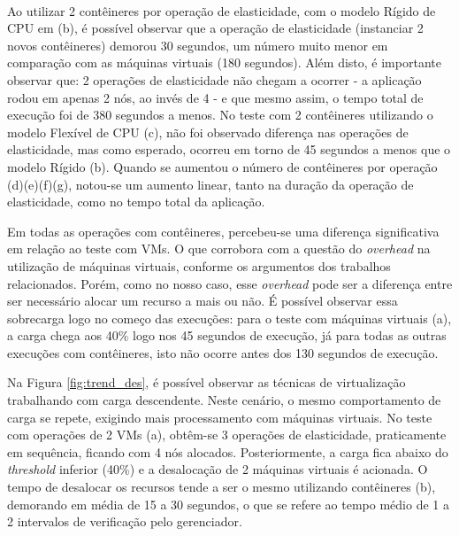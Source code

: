 \documentclass[twoside,english,brazilian]{UNISINOSartigo}
\begin{document}
\begin{figure}[ht!]
\vspace{-0.4\baselineskip}
\\
\end{figure}

Ao utilizar 2 contêineres por operação de elasticidade, com o modelo Rígido de CPU em (b), é possível observar que a operação de elasticidade (instanciar 2 novos contêineres) demorou 30 segundos, um número muito menor em comparação com as máquinas virtuais (180 segundos). Além disto, é importante observar que: 2 operações de elasticidade não chegam a ocorrer - a aplicação rodou em apenas 2 nós, ao invés de 4 - e que mesmo assim, o tempo total de execução foi de 380 segundos a menos. No teste com 2 contêineres utilizando o modelo Flexível de CPU (c), não foi observado diferença nas operações de elasticidade, mas como esperado, ocorreu em torno de 45 segundos a menos que o modelo Rígido (b). Quando se aumentou o número de contêineres por operação (d)(e)(f)(g), notou-se um aumento linear, tanto na duração da operação de elasticidade, como no tempo total da aplicação. 

Em todas as operações com contêineres, percebeu-se uma diferença significativa em relação ao teste com VMs. O que corrobora com a questão do \textit{overhead} na utilização de máquinas virtuais, conforme os argumentos dos trabalhos relacionados. Porém, como no nosso caso, esse \textit{overhead} pode ser a diferença entre ser necessário alocar um recurso a mais ou não. É possível observar essa sobrecarga logo no começo das execuções: para o teste com máquinas virtuais (a), a carga chega aos 40\% logo nos 45 segundos de execução, já para todas as outras execuções com contêineres, isto não ocorre antes dos 130 segundos de execução.

Na Figura \ref{fig:trend_des}, é possível observar as técnicas de virtualização trabalhando com carga descendente. Neste cenário, o mesmo comportamento de carga se repete, exigindo mais processamento com máquinas virtuais. No teste com operações de 2 VMs (a), obtêm-se 3 operações de elasticidade, praticamente em sequência, ficando com 4 nós alocados. Posteriormente, a carga fica abaixo do \textit{threshold} inferior (40\%) e a desalocação de 2 máquinas virtuais é acionada. O tempo de desalocar os recursos tende a ser o mesmo utilizando contêineres (b), demorando em média de 15 a 30 segundos, o que se refere ao tempo médio de 1 a 2 intervalos de verificação pelo gerenciador.
\end{document}
